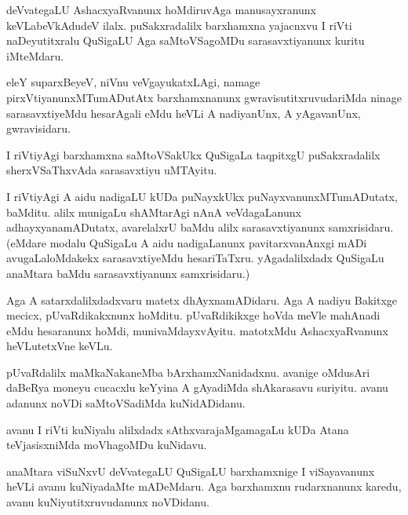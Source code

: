 \documentclass{article}
\begin{document}
\begin{mn}
deVvategaLU  AshacxyaRvanunx  hoMdiruvAga  manusayxranunx  keVLabeVkAdudeV  ilalx.  puSakxradalilx  
barxhamxna  yajacnxvu  I riVti  naDeyutitxralu  QuSigaLU  Aga  saMtoVSagoMDu  sarasavxtiyanunx  kuritu  iMteMdaru. 
\end{mn}

\begin{mn}
eleY  suparxBeyeV,  niVnu  veVgayukatxLAgi,  namage  pirxVtiyanunxMTumADutAtx  
barxhamxnanunx  gwravisutitxruvudariMda  ninage  sarasavxtiyeMdu  hesarAgali  
eMdu  heVLi  A  nadiyanUnx,  A  yAgavanUnx,  gwravisidaru.
\end{mn}

\begin{mn}
I riVtiyAgi  barxhamxna  saMtoVSakUkx  QuSigaLa  taqpitxgU  puSakxradalilx  
sherxVSaThxvAda  sarasavxtiyu  uMTAyitu.
\end{mn}

\begin{mn}
I riVtiyAgi  A  aidu  nadigaLU  kUDa  puNayxkUkx  puNayxvanunxMTumADutatx,  
baMditu.  alilx  munigaLu  shAMtarAgi  nAnA  veVdagaLanunx  adhayxyanamADutatx,  
avarelalxrU  baMdu  alilx  sarasavxtiyanunx  samxrisidaru.  (eMdare  modalu  
QuSigaLu  A aidu  nadigaLanunx  pavitarxvanAnxgi  mADi  avugaLaloMdakekx  
sarasavxtiyeMdu  hesariTaTxru.  yAgadalilxdadx  QuSigaLu  anaMtara  baMdu  
sarasavxtiyanunx  samxrisidaru.)
\end{mn}

\begin{mn}
Aga  A  satarxdalilxdadxvaru  matetx  dhAyxnamADidaru.  Aga  A  nadiyu  Bakitxge  
mecicx,  pUvaRdikakxnunx  hoMditu.  pUvaRdikikxge  hoVda meVle  mahAnadi  eMdu  
hesaranunx hoMdi,  munivaMdayxvAyitu.  matotxMdu  AshacxyaRvanunx  heVLutetxVne  keVLu.
\end{mn}

\begin{mn}
pUvaRdalilx  maMkaNakaneMba  bArxhamxNanidadxnu.  avanige  oMdusAri  daBeRya  
moneyu  cucacxlu  keYyina  A  gAyadiMda  shAkarasavu  suriyitu.  avanu  adanunx  
noVDi  saMtoVSadiMda  kuNidADidanu.
\end{mn}

\begin{mn}
avanu  I riVti  kuNiyalu  alilxdadx  sAthxvarajaMgamagaLu  kUDa  Atana  
teVjasisxniMda  moVhagoMDu  kuNidavu.
\end{mn}

\begin{mn}
anaMtara  viSuNxvU  deVvategaLU  QuSigaLU  barxhamxnige  I viSayavanunx  
heVLi  avanu  kuNiyadaMte  mADeMdaru.  Aga  barxhamxnu  rudarxnanunx  
karedu,  avanu kuNiyutitxruvudanunx  noVDidanu.
\end{mn}
\end{document}

